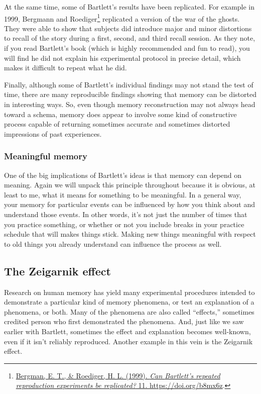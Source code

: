 \documentclass[
  oneside,
  12pt]{crumpbook}
\begin{document}
At the same time, some of Bartlett's results have been replicated. For example in 1999, Bergmann and Roediger\footnote{\protect\hyperlink{ref-bergmanCanBartlettRepeated1999}{Bergman, E. T., \& Roediger, H. L. (1999). \emph{Can {Bartlett}'s repeated reproduction experiments be replicated?} 11. \url{https://doi.org/b8mx6z}}.} replicated a version of the war of the ghosts. They were able to show that subjects did introduce major and minor distortions to recall of the story during a first, second, and third recall session. As they note, if you read Bartlett's book (which is highly recommended and fun to read), you will find he did not explain his experimental protocol in precise detail, which makes it difficult to repeat what he did.

Finally, although some of Bartlett's individual findings may not stand the test of time, there are many reproducible findings showing that memory can be distorted in interesting ways. So, even though memory reconstruction may not always head toward a schema, memory does appear to involve some kind of constructive process capable of returning sometimes accurate and sometimes distorted impressions of past experiences.

\hypertarget{meaningful-memory}{%
\subsubsection{Meaningful memory}\label{meaningful-memory}}

One of the big implications of Bartlett's ideas is that memory can depend on meaning. Again we will unpack this principle throughout because it is obvious, at least to me, what it means for something to be meaningful. In a general way, your memory for particular events can be influenced by how you think about and understand those events. In other words, it's not just the number of times that you practice something, or whether or not you include breaks in your practice schedule that will makes things stick. Making new things meaningful with respect to old things you already understand can influence the process as well.

\hypertarget{the-zeigarnik-effect}{%
\subsection{The Zeigarnik effect}\label{the-zeigarnik-effect}}

Research on human memory has yield many experimental procedures intended to demonstrate a particular kind of memory phenomena, or test an explanation of a phenomena, or both. Many of the phenomena are also called ``effects,'' sometimes credited person who first demonstrated the phenomena. And, just like we saw earlier with Bartlett, sometimes the effect and explanation becomes well-known, even if it isn't reliably reproduced. Another example in this vein is the Zeigarnik effect.
\end{document}
